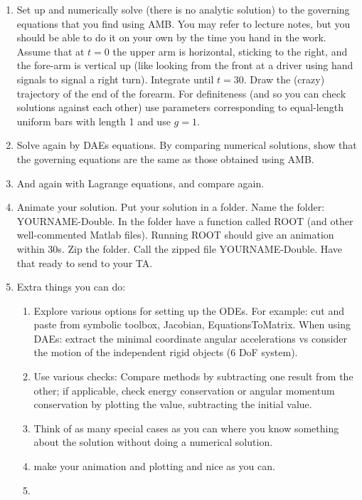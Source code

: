 \documentclass[11pt]{article}
\def\tight{ \setlength{\itemsep}{1.5pt}\setlength{\parskip}{0pt}\setlength{\parsep}{0pt}}
\begin{document}
\begin{enumerate}
\begin{enumerate}\tight
\item Set up and numerically solve (there is no analytic solution) to the  governing equations that you find using  AMB. You may refer to lecture notes, but you should be able to do it on your own by the time you hand in the work.   Assume that at $t=0$
the upper arm is horizontal, sticking to the right, and the fore-arm is vertical up (like looking from the
front at a driver using hand signals to signal a right turn).  Integrate until $t=30$.  Draw the (crazy) trajectory of
the end of the forearm.  For definiteness (and so you can check solutions against each other) use  parameters corresponding to equal-length uniform bars with length 1 and use $g=1$.



\item Solve again by DAEs equations.   By comparing numerical solutions, show that
the governing equations are the same as those obtained using AMB. 

\item  And again with Lagrange equations, and compare again.

\item  Animate your solution.  Put your solution in a folder.  Name the folder:  YOURNAME-Double.   In the folder have a function called ROOT (and other
well-commented Matlab files).  Running ROOT should give an animation within 30s.  Zip the folder.  Call the zipped file YOURNAME-Double.    Have that ready to send to your TA.

\item  Extra things you can do:

\begin{enumerate}
\item  Explore various options for setting up the ODEs. For example:  cut and paste from symbolic toolbox, Jacobian, EquationsToMatrix.  When using DAEs: extract the minimal coordinate angular accelerations vs consider the motion of the independent rigid objects (6 DoF system). 
\item  Use various checks: Compare methods by subtracting one result from the other; if applicable, check energy conservation or angular momentum conservation  by plotting the value, subtracting the initial value.
\item Think of as many special cases as you can where you know something about the solution without doing a numerical solution.
\item make your animation and plotting and nice as you can.
\item \etc



\end{enumerate}
\end{enumerate}
\end{enumerate}
\end{document}
